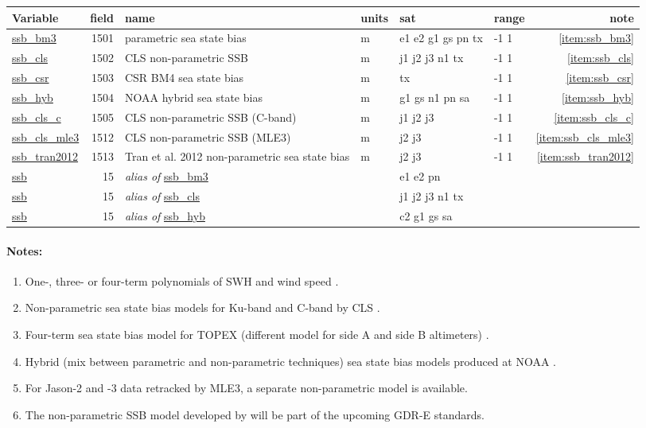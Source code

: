 \documentclass[a4paper,11pt,openany,natbib,nomargin]{thesis}
\makeatletter
\newcommand\var[1]{\url{#1}\index{variables!#1@\protect\url{#1}}}
\newcommand\alias[1]{\emph{alias of} \var{#1}}
\newenvironment{vartable}{
\begin{table}[ht]
\small
\begin{tabular}{lrllllr}
\hline
Variable & field & name & units & sat & range & note \\
\hline
}{
\hline
\end{tabular}
\end{table}
}
\newenvironment{notes}[1][Notes:]{\FloatBarrier\paragraph{#1}\begin{enumerate}}{\end{enumerate}}
\makeatother
\begin{document}
\begin{vartable}
\var{ssb_bm3} & 1501 & parametric sea state bias & m & e1 e2 g1 gs pn tx & -1 1 & \ref{item:ssb_bm3} \\
\var{ssb_cls} & 1502 & CLS non-parametric SSB & m & j1 j2 j3 n1 tx       & -1 1 & \ref{item:ssb_cls} \\
\var{ssb_csr} & 1503 & CSR BM4 sea state bias & m & tx                & -1 1 & \ref{item:ssb_csr} \\
\var{ssb_hyb} & 1504 & NOAA hybrid sea state bias & m & g1 gs n1 pn sa & -1 1 & \ref{item:ssb_hyb} \\
\var{ssb_cls_c} & 1505 & CLS non-parametric SSB (C-band) & m & j1 j2 j3 & -1 1 & \ref{item:ssb_cls_c} \\
\var{ssb_cls_mle3} & 1512 & CLS non-parametric SSB (MLE3) & m & j2 j3      & -1 1 & \ref{item:ssb_cls_mle3} \\
\var{ssb_tran2012} & 1513 & Tran et al. 2012 non-parametric sea state bias & m & j2 j3 & -1 1 & \ref{item:ssb_tran2012} \\
\hline
\var{ssb}     &   15 & \alias{ssb_bm3} && e1 e2 pn && \\
\var{ssb}     &   15 & \alias{ssb_cls} && j1 j2 j3 n1 tx && \\
\var{ssb}     &   15 & \alias{ssb_hyb} && c2 g1 gs sa && \\
\end{vartable}


\begin{notes}
\item One-, three- or four-term polynomials of SWH and wind speed \citep{gaspar1994a}.\label{item:ssb_bm3}
\item Non-parametric sea state bias models for Ku-band and C-band by CLS \citep{gaspar2002,labroue2004}.\label{item:ssb_cls}\label{item:ssb_cls_c}
\item Four-term sea state bias model for TOPEX (different model for side A and side B altimeters) \citep{chambers2003a}.\label{item:ssb_csr}
\item Hybrid (mix between parametric and non-parametric techniques) sea state bias models produced at NOAA \citep{scharroo2005e}.\label{item:ssb_hyb}
\item For Jason-2 and -3 data retracked by MLE3, a separate non-parametric model is available.\label{item:ssb_cls_mle3}
\item The non-parametric SSB model developed by \citet{tran2012} will be part of the upcoming GDR-E standards.\label{item:ssb_tran2012}
\end{notes}
\end{document}
